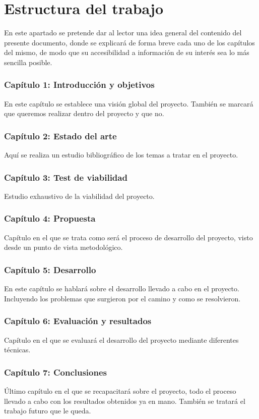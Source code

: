 \section{Estructura del trabajo}

En este apartado se pretende dar al lector una idea general del contenido del presente
documento, donde se explicará de forma breve cada uno de los capítulos del mismo, de modo
que su accesibilidad a información de su interés sea lo más sencilla posible.

\subsubsection{Capítulo 1: Introducción y objetivos}
En este capítulo se establece una visión global del proyecto. También se marcará
que queremos realizar dentro del proyecto y que no.

\subsubsection{Capítulo 2: Estado del arte}
Aquí se realiza un estudio bibliográfico de los temas a tratar en el proyecto.

\subsubsection{Capítulo 3: Test de viabilidad}
Estudio exhaustivo de la viabilidad del proyecto.

\subsubsection{Capítulo 4: Propuesta}
Capítulo en el que se trata como será el proceso de desarrollo del proyecto, visto
desde un punto de vista metodológico.

\subsubsection{Capítulo 5: Desarrollo}
En este capítulo se hablará sobre el desarrollo llevado a cabo en el proyecto.
Incluyendo los problemas que surgieron por el camino y como se resolvieron.

\subsubsection{Capítulo 6: Evaluación y resultados}
Capítulo en el que se evaluará el desarrollo del proyecto mediante diferentes
técnicas.

\subsubsection{Capítulo 7: Conclusiones}
Último capítulo en el que se recapacitará sobre el proyecto, todo el proceso llevado
a cabo con los resultados obtenidos ya en mano. También se tratará el trabajo
futuro que le queda.
